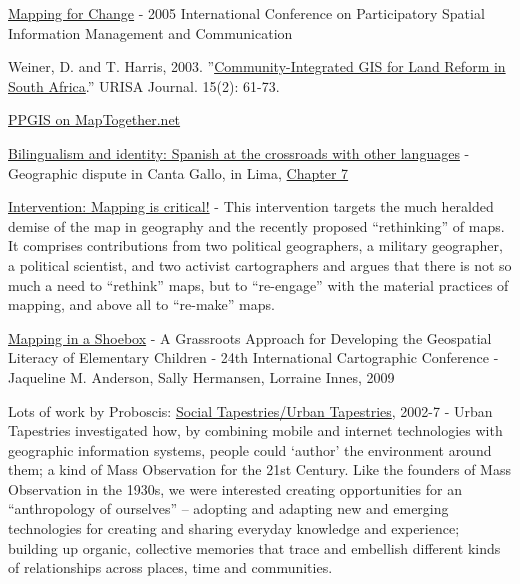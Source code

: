 \documentclass[11pt]{report}
\begin{document}
\href{http://www.iapad.org/pgis2005/}{Mapping for Change} - 2005 International Conference on Participatory Spatial Information Management and Communication

Weiner, D. and T. Harris, 2003. ''{}\href{http://www.rri.wvu.edu/pdffiles/gisweiner.pdf}{Community-Integrated GIS for Land Reform in South Africa}.''{} URISA Journal. 15(2): 61-73.

\href{http://www.maptogether.net/taxonomy/term/151}{PPGIS on MapTogether.net}

\href{http://books.google.com/books?hl=en&lr=&id=_VK-ABCKlVgC&oi=fnd&pg=PA3&dq=Nino+Bariola&ots=_r1wMwjiou&sig=TH0Gn1P27Xtsdq2Oc0Up5D6HLzg#v=onepage&q=Nino%20Bariola&f=false}{Bilingualism and identity: Spanish at the crossroads with other languages} - Geographic dispute in Canta Gallo, in Lima, \href{http://books.google.com/books?id=_VK-ABCKlVgC&lpg=PA3&ots=_r1wMwjiou&dq=Nino%20Bariola&lr=&pg=PA153#v=onepage&q=&f=true}{Chapter 7}

\href{http://www.sciencedirect.com/science?_ob=ArticleURL&_udi=B6VG2-4XHJX4B-1&_user=10&_coverDate=08/31/2009&_rdoc=1&_fmt=high&_orig=search&_sort=d&_docanchor=&view=c&_searchStrId=1186930669&_rerunOrigin=google&_acct=C000050221&_version=1&_urlVersion=0&_userid=10&md5=a9327ffa62e089e863f892a4551c1717}{Intervention: Mapping is critical!} - This intervention targets the much heralded demise of the map in geography and the recently proposed “rethinking” of maps. It comprises contributions from two political geographers, a military geographer, a political scientist, and two activist cartographers and argues that there is not so much a need to “rethink” maps, but to “re-engage” with the material practices of mapping, and above all to “re-make” maps.

\href{http://training.esri.com/campus/library/bibliography/RecordDetail.cfm?ID=95545&browseonly=0}{Mapping in a Shoebox} - A Grassroots Approach for Developing the Geospatial Literacy of Elementary Children - 24th International Cartographic Conference - Jaqueline M. Anderson, Sally Hermansen, Lorraine Innes, 2009

Lots of work by Proboscis: \href{http://urbantapestries.net/}{Social Tapestries/Urban Tapestries}, 2002-7 - Urban Tapestries investigated how, by combining mobile and internet technologies with geographic information systems, people could `{}author'{} the environment around them; a kind of Mass Observation for the 21st Century. Like the founders of Mass Observation in the 1930s, we were interested creating opportunities for an ``{}anthropology of ourselves''{} – adopting and adapting new and emerging technologies for creating and sharing everyday knowledge and experience; building up organic, collective memories that trace and embellish different kinds of relationships across places, time and communities.
\end{document}

